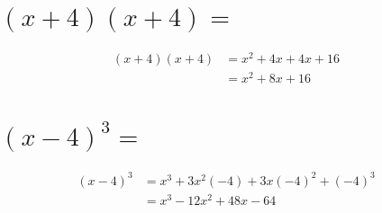\documentclass[12pt,addpoints]{evalua}
\begin{document}
\begin{questions}
\begin{multicols}{2}
\begin{parts}

            \part {\Large $(x+4)(x+4)=$}

            \begin{solutionbox}{3cm}\large
                \begin{align*}
                    (x+4)(x+4) & = x^2+4x+4x+16 \\
                               & = x^2+8x+16
                \end{align*}
            \end{solutionbox}



            \part {\Large $(x-4)^3=$}

            \begin{solutionbox}{3cm}\normalsize
                \begin{align*}
                    (x-4)^3 & = x^3+3x^2(-4)+3x(-4)^2+(-4)^3 \\
                            & = x^3-12x^2+48x-64
                \end{align*}
            \end{solutionbox}



\end{parts}
\end{multicols}
\end{questions}
\end{document}
